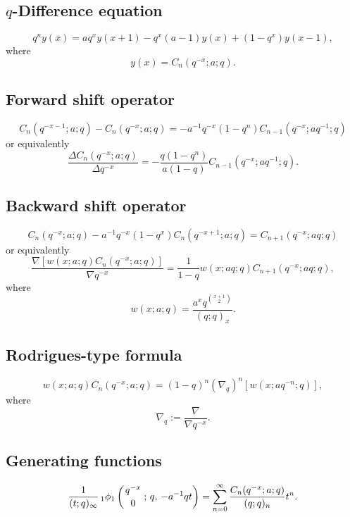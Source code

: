 \documentclass[envcountchap,graybox]{svmono}
\newcommand{\qhyp}[5]{\mbox{}_{#1}{\phi}_{#2}
\left(\genfrac{}{}{0pt}{}{#3}{#4}\,;\,q,\,#5\right)}
\newcommand{\qhyp}[5]{\,\mbox{}_{#1}\phi_{#2}\!\left(
  \genfrac{}{}{0pt}{}{#3}{#4};#5\right)}
\begin{document}
{{\subsection*{$q$-Difference equation}
\begin{equation}
\label{dvqCharlier}
q^ny(x)=aq^xy(x+1)-q^x(a-1)y(x)+(1-q^x)y(x-1),
\end{equation}
where
$$y(x)=C_n(q^{-x};a;q).$$

\subsection*{Forward shift operator}
\begin{equation}
\label{shift1qCharlierI}
C_n(q^{-x-1};a;q)-C_n(q^{-x};a;q)=-a^{-1}q^{-x}(1-q^n)C_{n-1}(q^{-x};aq^{-1};q)
\end{equation}
or equivalently
\begin{equation}
\label{shift1qCharlierII}
\frac{\Delta C_n(q^{-x};a;q)}{\Delta q^{-x}}=-\frac{q(1-q^n)}{a(1-q)}C_{n-1}(q^{-x};aq^{-1};q).
\end{equation}

\newpage

\subsection*{Backward shift operator}
\begin{equation}
\label{shift2qCharlierI}
C_n(q^{-x};a;q)-a^{-1}q^{-x}(1-q^x)C_n(q^{-x+1};a;q)=C_{n+1}(q^{-x};aq;q)
\end{equation}
or equivalently
\begin{equation}
\label{shift2qCharlierII}
\frac{\nabla\left[w(x;a;q)C_n(q^{-x};a;q)\right]}{\nabla q^{-x}}
=\frac{1}{1-q}w(x;aq;q)C_{n+1}(q^{-x};aq;q),
\end{equation}
where
$$w(x;a;q)=\frac{a^xq^{\binom{x+1}{2}}}{(q;q)_x}.$$

\subsection*{Rodrigues-type formula}
\begin{equation}
\label{RodqCharlier}
w(x;a;q)C_n(q^{-x};a;q)=(1-q)^n\left(\nabla_q\right)^n\left[w(x;aq^{-n};q)\right],
\end{equation}
where
$$\nabla_q:=\frac{\nabla}{\nabla q^{-x}}.$$

\subsection*{Generating functions}
\begin{equation}
\label{GenqCharlier1}
\frac{1}{(t;q)_{\infty}}\,\qhyp{1}{1}{q^{-x}}{0}{-a^{-1}qt}
=\sum_{n=0}^{\infty}\frac{C_n(q^{-x};a;q)}{(q;q)_n}t^n.
\end{equation}

}}
\end{document}
